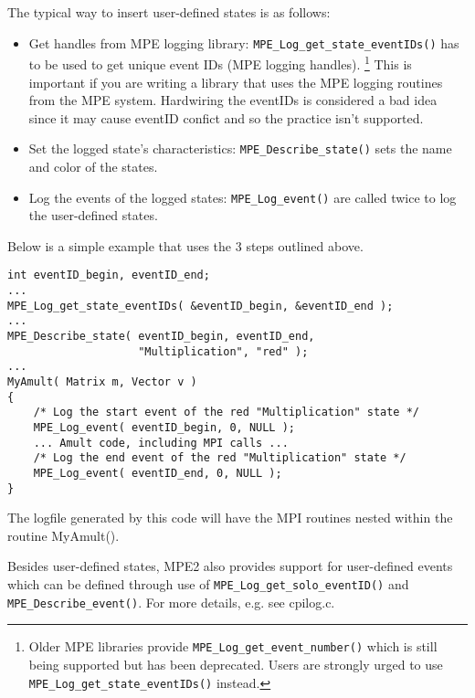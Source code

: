 \documentclass[dvipdfm,11pt]{article}
\begin{document}
The typical way to insert user-defined states is as follows:
\begin{itemize}
\item{Get handles from MPE logging library:
      \texttt{MPE\_Log\_get\_state\_eventIDs()}
      has to be used to get unique event IDs (MPE logging handles).
        \footnote{Older MPE libraries provide
        \texttt{MPE\_Log\_get\_event\_number()} which is still being
        supported but has been deprecated.  Users are strongly urged
        to use \texttt{MPE\_Log\_get\_state\_eventIDs()} instead.}
      This is important if you are writing a library that uses
      the MPE logging routines from the MPE system.  Hardwiring the
      eventIDs is considered a bad idea since it may cause eventID
      confict and so the practice isn't supported.}
\item{Set the logged state's characteristics: \texttt{MPE\_Describe\_state()}
      sets the name and color of the states.}
\item{Log the events of the logged states: \texttt{MPE\_Log\_event()}
      are called twice to log the user-defined states.}
\end{itemize}
Below is a simple example that uses the 3 steps outlined above.
\begin{samepage}
\begin{verbatim}
int eventID_begin, eventID_end;
...
MPE_Log_get_state_eventIDs( &eventID_begin, &eventID_end );
...
MPE_Describe_state( eventID_begin, eventID_end,
                    "Multiplication", "red" );
...
MyAmult( Matrix m, Vector v )
{
    /* Log the start event of the red "Multiplication" state */
    MPE_Log_event( eventID_begin, 0, NULL );
    ... Amult code, including MPI calls ...
    /* Log the end event of the red "Multiplication" state */
    MPE_Log_event( eventID_end, 0, NULL );
}
\end{verbatim}
\end{samepage}
The logfile generated by this code will have the MPI routines nested within
the routine MyAmult().

Besides user-defined states, MPE2 also provides support for user-defined
events which can be defined through use of
\texttt{MPE\_Log\_get\_solo\_eventID()} and \texttt{MPE\_Describe\_event()}.
For more details, e.g. see cpilog.c.
\end{document}
